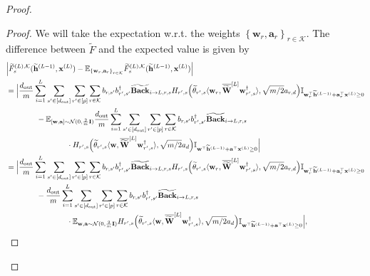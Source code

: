 \begin{claim}
\begin{proof}
				\begin{proof}
					We will take the expectation w.r.t. the weights $\left\{ \mathbf{w}_r, \mathbf{a}_r \right\}_{r \in \mathcal{K}}$. The difference between $\widetilde{F}$ and the expected value is given by
					\begingroup \allowdisplaybreaks
					\begin{align}
						&\abs{\widetilde{F}_{s}^{(L), \mathcal{K}}(\widetilde{\mathbf{h}}^{(L-1)}, \mathbf{x}^{(L)}) - \mathbb{E}_{\left\{ \mathbf{w}_r, \mathbf{a}_r \right\}_{r \in \mathcal{K}}} \widetilde{F}_{s}^{(L), \mathcal{K}}(\widetilde{\mathbf{h}}^{(L-1)}, \mathbf{x}^{(L)})} \nonumber\\
						&=\Big|\frac{\dout }{m} \sum_{i=1}^{L}  \sum_{s' \in [\dout ]} \sum_{r' \in [p]} \sum_{r \in \mathcal{K}}  b_{r, s'} b_{r', s'}^{\dagger} \widetilde{\mathbf{Back}}_{i \to L, r, s} H_{r', s}\Big(\widetilde{\theta}_{r', s} \langle \mathbf{w}_{r}, \overline{\widetilde{\mathbf{W}}}^{[L]} \mathbf{w}_{r', s}^{\dagger}\rangle, \sqrt{m/2} a_{r, d}\Big) \mathbb{I}_{\mathbf{w}_r^{\top} \widetilde{\mathbf{h}}^{(L-1)} + \mathbf{a}_r^{\top} \mathbf{x}^{(L)} \ge 0} \nonumber\\&
						\quad\quad\quad\quad -  \mathbb{E}_{[\mathbf{w}, \mathbf{a}] \sim \mathcal{N}(0, \frac{2}{m}\mathbf{I})} \frac{\dout }{m} \sum_{i=1}^{L}  \sum_{s' \in [\dout ]} \sum_{r' \in [p]} \sum_{r \in \mathcal{K}}  b_{r, s'} b_{r', s'}^{\dagger} \widetilde{\mathbf{Back}}_{i \to L, r, s} \nonumber\\& \quad\quad\quad\quad \quad\quad\quad\quad \cdot H_{r', s}\Big(\widetilde{\theta}_{r', s} \langle \mathbf{w}, \overline{\widetilde{\mathbf{W}}}^{[L]} \mathbf{w}_{r', s}^{\dagger}\rangle, \sqrt{m/2} a_{d}\Big) \mathbb{I}_{\mathbf{w}^{\top} \widetilde{\mathbf{h}}^{(L-1)} + \mathbf{a}^{\top} \mathbf{x}^{(L)} \ge 0}\Big| \nonumber\\&
						=\Big|\frac{\dout }{m} \sum_{i=1}^{L}  \sum_{s' \in [\dout ]} \sum_{r' \in [p]} \sum_{r \in \mathcal{K}}  b_{r, s'} b_{r', s'}^{\dagger} \widetilde{\mathbf{Back}}_{i \to L, r, s} H_{r', s}\Big(\widetilde{\theta}_{r', s} \langle \mathbf{w}_{r}, \overline{\widetilde{\mathbf{W}}}^{[L]} \mathbf{w}_{r', s}^{\dagger}\rangle, \sqrt{m/2} a_{r, d}\Big) \mathbb{I}_{\mathbf{w}_r^{\top} \widetilde{\mathbf{h}}^{(L-1)} + \mathbf{a}_r^{\top} \mathbf{x}^{(L)} \ge 0} \nonumber\\&
						\quad\quad\quad\quad -  \frac{\dout }{m} \sum_{i=1}^{L}  \sum_{s' \in [\dout ]} \sum_{r' \in [p]} \sum_{r \in \mathcal{K}}  b_{r, s'} b_{r', s'}^{\dagger} \widetilde{\mathbf{Back}}_{i \to L, r, s} \nonumber\\& \quad\quad\quad\quad \quad\quad\quad\quad \cdot  \mathbb{E}_{\mathbf{w}, \mathbf{a} \sim \mathcal{N}(0, \frac{2}{m}\mathbf{I})} H_{r', s}\Big(\widetilde{\theta}_{r', s} \langle \mathbf{w}, \overline{\widetilde{\mathbf{W}}}^{[L]} \mathbf{w}_{r', s}^{\dagger}\rangle, \sqrt{m/2} a_{d}\Big) \mathbb{I}_{\mathbf{w}^{\top} \widetilde{\mathbf{h}}^{(L-1)} + \mathbf{a}^{\top} \mathbf{x}^{(L)} \ge 0}\Big|, \label{Eqn:conc_H}

\end{align}
\end{proof}
\end{proof}
\end{claim}
